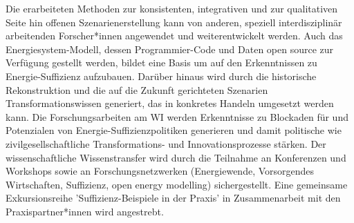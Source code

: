 \documentclass[a4paper,11pt,twoside]{scrartcl}
\begin{document}
Die erarbeiteten Methoden zur konsistenten, integrativen und zur qualitativen Seite hin offenen Szenarienerstellung kann von anderen, speziell interdisziplinär arbeitenden Forscher*innen angewendet und weiterentwickelt werden. Auch das Energiesystem-Modell, dessen Programmier-Code und Daten open source zur Verfügung gestellt werden, bildet eine Basis um auf den Erkenntnissen zu Energie-Suffizienz aufzubauen. Darüber hinaus wird durch die historische Rekonstruktion und die auf die Zukunft gerichteten Szenarien Transformationswissen generiert, das in konkretes Handeln umgesetzt werden kann. Die Forschungsarbeiten am WI werden Erkenntnisse zu Blockaden für und Potenzialen von Energie-Suffizienzpolitiken generieren und damit politische wie zivilgesellschaftliche Transformations- und Innovationsprozesse stärken. Der wissenschaftliche Wissenstransfer wird durch die Teilnahme an Konferenzen und Workshops sowie an Forschungsnetzwerken (Energiewende, Vorsorgendes Wirtschaften, Suffizienz, open energy modelling) sichergestellt. Eine gemeinsame Exkursionsreihe 'Suffizienz-Beispiele in der Praxis' in Zusammenarbeit mit den Praxispartner*innen wird angestrebt.
\end{document}
